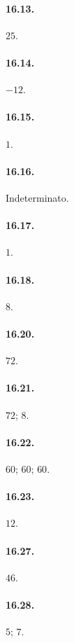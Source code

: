 \begin{multicols}{2}
\paragraph{16.13.}
$25$.

\paragraph{16.14.}
$-12$.

\paragraph{16.15.}
$1$.

\paragraph{16.16.}
Indeterminato.

\paragraph{16.17.}
$1$.

\paragraph{16.18.}
$8$.

\paragraph{16.20.}
$72$.

\paragraph{16.21.}
$72$; $8$.

\paragraph{16.22.}
$60$; $60$; $60$.

\paragraph{16.23.}
$12$.

\paragraph{16.27.}
$46$.

\paragraph{16.28.}
$5$; $7$.


\end{multicols}
